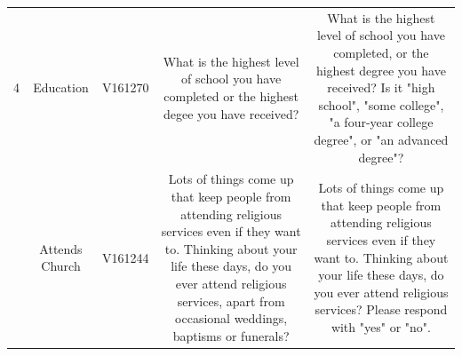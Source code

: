 \documentclass[11pt]{article}
\begin{document}
\begin{longtable}{ccccc}
    \multirow{8}{2em}{4} & \multirow{8}{4.5em}{Education} & \multirow{8}{4em}{V161270} & \multirow{8}{12em}{What is the highest level of school you have completed or the highest degee you have received?} & \multirow{8}{12em}{What is the highest level of school you have completed, or the highest degree you have received? Is it "high school", "some college", "a four-year college degree", or "an advanced degree"?}\\&&&&\\&&&&\\&&&&\\&&&&\\&&&&\\&&&&\\&&&&\\
    \hline
    \pagebreak

    \multirow{11}{2em}{5} & \multirow{11}{4.5em}{Attends Church} & \multirow{11}{4em}{V161244} & \multirow{11}{12em}{Lots of things come up that keep people from attending religious services even if they want to. Thinking about your life these days, do you ever attend religious services, apart from occasional weddings, baptisms or funerals?} & \multirow{11}{12em}{Lots of things come up that keep people from attending religious services even if they want to. Thinking about your life these days, do you ever attend religious services? Please respond with "yes" or "no".}\\&&&&\\&&&&\\&&&&\\&&&&\\&&&&\\&&&&\\&&&&\\&&&&\\&&&&\\&&&&\\
    \hline


\end{longtable}
\end{document}
